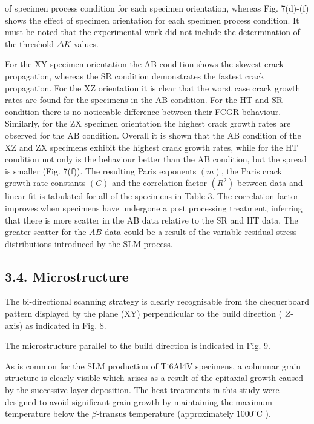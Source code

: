 \documentclass[10pt]{article}
\begin{document}
of specimen process condition for each specimen orientation, whereas Fig. 7(d)-(f) shows the effect of specimen orientation for each specimen process condition. It must be noted that the experimental work did not include the determination of the threshold $\Delta K$ values.

For the XY specimen orientation the AB condition shows the slowest crack propagation, whereas the SR condition demonstrates the fastest crack propagation. For the XZ orientation it is clear that the worst case crack growth rates are found for the specimens in the AB condition. For the HT and SR condition there is no noticeable difference between their FCGR behaviour. Similarly, for the ZX specimen orientation the highest crack growth rates are observed for the $\mathrm{AB}$ condition. Overall it is shown that the $\mathrm{AB}$ condition of the $\mathrm{XZ}$ and $\mathrm{ZX}$ specimens exhibit the highest crack growth rates, while for the HT condition not only is the behaviour better than the $\mathrm{AB}$ condition, but the spread is smaller (Fig. 7(f)). The resulting Paris exponents $(m)$, the Paris crack growth rate constants $(C)$ and the correlation factor $\left(R^{2}\right)$ between data and linear fit is tabulated for all of the specimens in Table 3. The correlation factor improves when specimens have undergone a post processing treatment, inferring that there is more scatter in the AB data relative to the SR and HT data. The greater scatter for the $A B$ data could be a result of the variable residual stress distributions introduced by the SLM process.

\subsection*{3.4. Microstructure}
The bi-directional scanning strategy is clearly recognisable from the chequerboard pattern displayed by the plane (XY) perpendicular to the build direction ( $Z$-axis) as indicated in Fig. 8.

The microstructure parallel to the build direction is indicated in Fig. 9.

As is common for the SLM production of Ti6Al4V specimens, a columnar grain structure is clearly visible which arises as a result of the epitaxial growth caused by the successive layer deposition. The heat treatments in this study were designed to avoid significant grain growth by maintaining the maximum temperature below the $\beta$-transus temperature (approximately $1000^{\circ} \mathrm{C}$ ).
\end{document}
